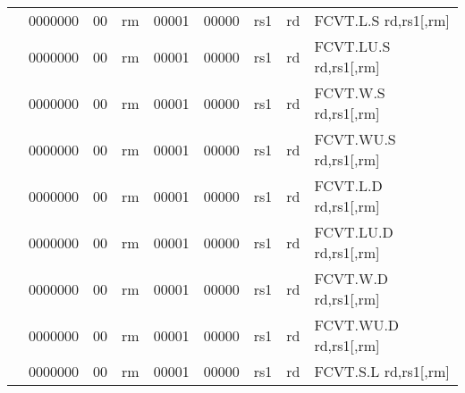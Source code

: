 \begin{table}[p]
\begin{small}
\begin{center}
\begin{tabular}{rcccccccccl}
&
\multicolumn{1}{|c|}{0000000} &
\multicolumn{1}{c|}{00} &
\multicolumn{2}{c|}{rm} &
\multicolumn{2}{c|}{00001} &
\multicolumn{1}{c|}{00000} &
\multicolumn{1}{c|}{rs1} &
\multicolumn{1}{c|}{rd} & FCVT.L.S rd,rs1[,rm] \\
\cline{2-10}
  

&
\multicolumn{1}{|c|}{0000000} &
\multicolumn{1}{c|}{00} &
\multicolumn{2}{c|}{rm} &
\multicolumn{2}{c|}{00001} &
\multicolumn{1}{c|}{00000} &
\multicolumn{1}{c|}{rs1} &
\multicolumn{1}{c|}{rd} & FCVT.LU.S rd,rs1[,rm] \\
\cline{2-10}
  

&
\multicolumn{1}{|c|}{0000000} &
\multicolumn{1}{c|}{00} &
\multicolumn{2}{c|}{rm} &
\multicolumn{2}{c|}{00001} &
\multicolumn{1}{c|}{00000} &
\multicolumn{1}{c|}{rs1} &
\multicolumn{1}{c|}{rd} & FCVT.W.S rd,rs1[,rm] \\
\cline{2-10}
  

&
\multicolumn{1}{|c|}{0000000} &
\multicolumn{1}{c|}{00} &
\multicolumn{2}{c|}{rm} &
\multicolumn{2}{c|}{00001} &
\multicolumn{1}{c|}{00000} &
\multicolumn{1}{c|}{rs1} &
\multicolumn{1}{c|}{rd} & FCVT.WU.S rd,rs1[,rm] \\
\cline{2-10}
  

&
\multicolumn{1}{|c|}{0000000} &
\multicolumn{1}{c|}{00} &
\multicolumn{2}{c|}{rm} &
\multicolumn{2}{c|}{00001} &
\multicolumn{1}{c|}{00000} &
\multicolumn{1}{c|}{rs1} &
\multicolumn{1}{c|}{rd} & FCVT.L.D rd,rs1[,rm] \\
\cline{2-10}
  

&
\multicolumn{1}{|c|}{0000000} &
\multicolumn{1}{c|}{00} &
\multicolumn{2}{c|}{rm} &
\multicolumn{2}{c|}{00001} &
\multicolumn{1}{c|}{00000} &
\multicolumn{1}{c|}{rs1} &
\multicolumn{1}{c|}{rd} & FCVT.LU.D rd,rs1[,rm] \\
\cline{2-10}
  

&
\multicolumn{1}{|c|}{0000000} &
\multicolumn{1}{c|}{00} &
\multicolumn{2}{c|}{rm} &
\multicolumn{2}{c|}{00001} &
\multicolumn{1}{c|}{00000} &
\multicolumn{1}{c|}{rs1} &
\multicolumn{1}{c|}{rd} & FCVT.W.D rd,rs1[,rm] \\
\cline{2-10}
  

&
\multicolumn{1}{|c|}{0000000} &
\multicolumn{1}{c|}{00} &
\multicolumn{2}{c|}{rm} &
\multicolumn{2}{c|}{00001} &
\multicolumn{1}{c|}{00000} &
\multicolumn{1}{c|}{rs1} &
\multicolumn{1}{c|}{rd} & FCVT.WU.D rd,rs1[,rm] \\
\cline{2-10}
  

&
\multicolumn{1}{|c|}{0000000} &
\multicolumn{1}{c|}{00} &
\multicolumn{2}{c|}{rm} &
\multicolumn{2}{c|}{00001} &
\multicolumn{1}{c|}{00000} &
\multicolumn{1}{c|}{rs1} &
\multicolumn{1}{c|}{rd} & FCVT.S.L rd,rs1[,rm] \\
\cline{2-10}
  


\end{tabular}
\end{center}
\end{small}
\end{table}

